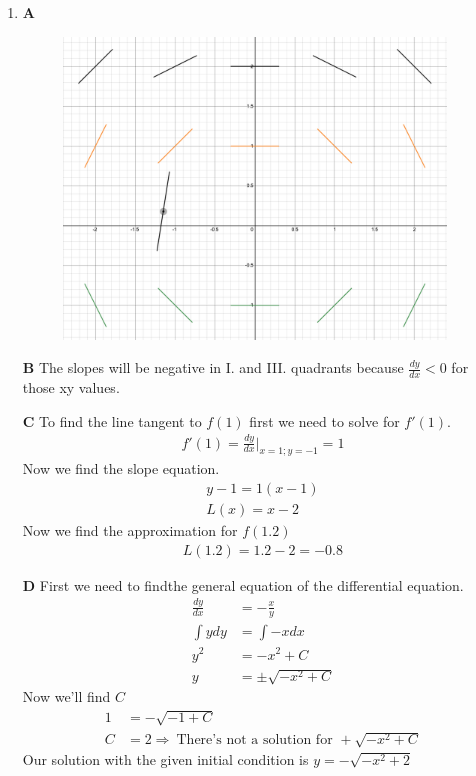 \documentclass[13pt, a4paper, twoside]{article}
\begin{document}
\begin{enumerate}
\large \onehalfspacing
\item \textbf{A} 
\begin{figure}[H]
    \centering
    \includegraphics[width=4in]{slope_field.png}
\end{figure}
\textbf{B} The slopes will be negative in I. and III. quadrants
because $\frac{dy}{dx}< 0$ for those xy values. 


\textbf{C} To find the line tangent to $f(1)$ first we need to solve for
$f'(1)$.
\begin{align*}
    f'(1) = \frac{dy}{dx}|_{x=1; y=-1} = 1
\end{align*} 
Now we find the slope equation.
\begin{align*}
    y-1 = 1(x-1)\\ 
    L(x) = x-2
\end{align*}
Now we find the approximation for $f(1.2)$
\begin{align*}
    L(1.2) = 1.2-2 = -0.8
\end{align*}


\textbf{D} First we need to findthe general equation of the differential
equation.
\begin{align*}
    \frac{dy}{dx} &=-\frac{x}{y}\\ 
    \int y dy &= \int -x dx \\
    y^2 &= -x^2 + C \\ 
    y &= \pm \sqrt{-x^2 + C} 
\end{align*}
Now we'll find $C$
\begin{align*}
    1 &= -\sqrt{-1 + C} \\
    C &= 2 \Rightarrow \: \text{There's not a solution for } +\sqrt{-x^2+C}
\end{align*}
Our solution with the given initial condition is $y = -\sqrt{-x^2 + 2}$


\end{enumerate}
\end{document}
